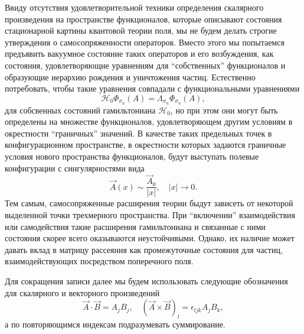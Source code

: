 \documentclass[12pt]{article}
\newcommand{\HH}{\mathscr{H}}
\begin{document}
    Ввиду отсутствия удовлетворительной
    техники определения скалярного произведения
    на пространстве функционалов, которые описывают состояния стационарной
    картины квантовой теории поля, мы не будем делать строгие утверждения
    о самосопряженности операторов. Вместо этого мы попытаемся предъявить
    вакуумное состояние таких операторов и его возбуждения, как состояния,
    удовлетворяющие уравнениям для ``собственных'' функционалов и образующие
    иерархию рождения и уничтожения частиц.
    Естественно потребовать, чтобы такие уравнения
    совпадали с функциональными уравнениями
\begin{equation*}
    \HH_{0} \Phi_{\sigma_{n}}(A) = \Lambda_{\sigma_{n}} \Phi_{\sigma_{n}}(A) ,
\end{equation*}
    для собсвенных состояний гамильтониана
$ \HH_{0} $,
    но при этом они могут быть определены на множестве функционалов,
    удовлетворяющем другим условиям в окрестности ``граничных'' значений.
    В качестве таких предельных точек в конфигурационном пространстве,
    в окрестности которых задаются граничные условия нового пространства
    функционалов, будут выступать полевые конфигурации с сингулярностями
    вида
\begin{equation}
\label{Asing}
    \vec{A}(x) \sim \frac{\vec{A}_{0}}{|x|}, \quad |x| \to 0.
\end{equation}
    Тем самым, самосопряженные расширения теории быдут зависеть от
    некоторой выделенной точки трехмерного пространства.
    При ``включении'' взаимодействия или самодействия такие расширения
    гамильтониана и связанные с ними состояния скорее всего
    оказываются неустойчивыми.
    Однако, их наличие может давать вклад в матрицу рассеяния как
    промежуточные состояния для частиц,
    взаимодействующих посредством поперечного поля.

    Для сокращения записи далее мы будем использовать следующие обозначения
    для скалярного и векторного произведений
\begin{equation*}
    \vec{A}\cdot\vec{B} = A_{j}B_{j} ,\quad
	(\vec{A}\times\vec{B})_{l} = \epsilon_{ljk} A_{j} B_{k} ,
\end{equation*}
    а по повторяющимся индексам подразумевать суммирование.
    
\end{document}
